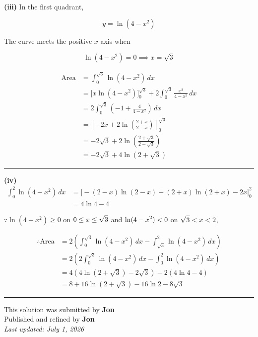 \documentclass[12pt]{article}
\begin{document}
\textbf{(iii)} In the first quadrant,

$$y=\ln(4-x^2)$$

The curve meets the positive $x$-axis when

$$\ln(4-x^2)=0\implies x=\sqrt3$$

\begin{align*}
\text{Area}
&=\int_0^{\sqrt3}\ln(4-x^2)\,dx\\
&=\Big[x\ln(4-x^2)\Big]_0^{\sqrt3}
+2\int_0^{\sqrt3}\frac{x^2}{4-x^2}\,dx\\
&=2\int_0^{\sqrt3}\left(-1+\frac4{4-x^2}\right)\,dx\\
&=\left[-2x+2\ln\left(\frac{2+x}{2-x}\right)\right]_0^{\sqrt3}\\
&=-2\sqrt3+2\ln\left(\frac{2+\sqrt3}{2-\sqrt3}\right)\\
&=-2\sqrt3+4\ln\left(2+\sqrt3\right)
\end{align*}

\bigskip\hrule\bigskip

\textbf{(iv)}
\begin{align*}
\int_0^2 \ln(4-x^2)\,dx
&=\Big[-(2-x)\ln(2-x)+(2+x)\ln(2+x)-2x\Big]_0^2\\
&=4\ln4-4
\end{align*}

$\because \ln(4-x^2)\geq 0$ on $\displaystyle 0\leq x\leq\sqrt3$ and $\displaystyle \ln(4-x^2)<0$ on $\displaystyle \sqrt3<x<2$,

\begin{align*}
\therefore \text{Area}
&=2\left(\int_0^{\sqrt3}\ln(4-x^2)\,dx-\int_{\sqrt3}^{2}\ln(4-x^2)\,dx\right)\\
&=2\left(2\int_0^{\sqrt3}\ln(4-x^2)\,dx-\int_0^2\ln(4-x^2)\,dx\right)\\
&=4\left(4\ln(2+\sqrt3)-2\sqrt3\right)-2(4\ln4-4)\\
&=8+16\ln(2+\sqrt3)-16\ln2-8\sqrt3
\end{align*}

\bigskip
\hrule
\begin{center}
    This solution was submitted by \textbf{Jon}\\[4pt]
    Published and refined by \textbf{Jon}\\[8pt]
    \textit{Last updated: July 1, 2026}
\end{center}
\end{document}
